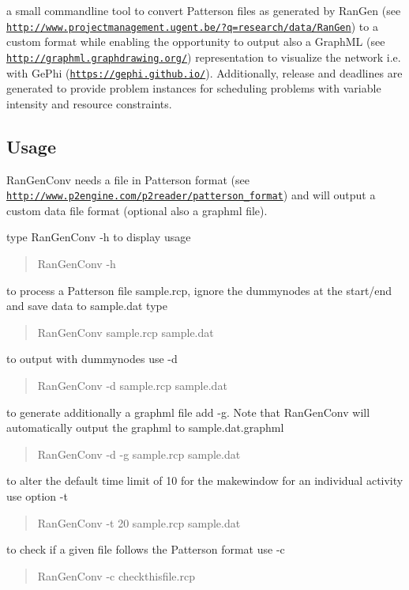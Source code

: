 a small commandline tool to convert Patterson files as generated by Ran\+Gen (see \href{http://www.projectmanagement.ugent.be/?q=research/data/RanGen}{\tt http\+://www.\+projectmanagement.\+ugent.\+be/?q=research/data/\+Ran\+Gen}) to a custom format while enabling the opportunity to output also a Graph\+M\+L (see \href{http://graphml.graphdrawing.org/}{\tt http\+://graphml.\+graphdrawing.\+org/}) representation to visualize the network i.\+e. with Ge\+Phi (\href{https://gephi.github.io/}{\tt https\+://gephi.\+github.\+io/}). Additionally, release and deadlines are generated to provide problem instances for scheduling problems with variable intensity and resource constraints.

\subsection*{Usage }

Ran\+Gen\+Conv needs a file in Patterson format (see \href{http://www.p2engine.com/p2reader/patterson_format}{\tt http\+://www.\+p2engine.\+com/p2reader/patterson\+\_\+format}) and will output a custom data file format (optional also a graphml file).


\begin{DoxyEnumerate}
\item type Ran\+Gen\+Conv -\/h to display usage \begin{quote}
Ran\+Gen\+Conv -\/h \end{quote}

\item to process a Patterson file \textquotesingle{}sample.\+rcp\textquotesingle{}, ignore the dummynodes at the start/end and save data to sample.\+dat type \begin{quote}
Ran\+Gen\+Conv sample.\+rcp sample.\+dat \end{quote}

\item to output with dummynodes use -\/d \begin{quote}
Ran\+Gen\+Conv -\/d sample.\+rcp sample.\+dat \end{quote}

\item to generate additionally a graphml file add -\/g. Note that Ran\+Gen\+Conv will automatically output the graphml to sample.\+dat.\+graphml \begin{quote}
Ran\+Gen\+Conv -\/d -\/g sample.\+rcp sample.\+dat \end{quote}

\item to alter the default time limit of 10 for the makewindow for an individual activity use option -\/t \begin{quote}
Ran\+Gen\+Conv -\/t 20 sample.\+rcp sample.\+dat \end{quote}

\item to check if a given file follows the Patterson format use -\/c \begin{quote}
Ran\+Gen\+Conv -\/c checkthisfile.\+rcp \end{quote}

\end{DoxyEnumerate}

